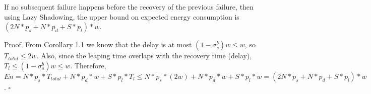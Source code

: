 \begin{theorem}
If no subsequent failure happens before the recovery of the previous failure, then using Lazy Shadowing, the upper bound on expected energy consumption is
$(2N * p_s + N * p_d + S * p_{l})*w$.
\end{theorem}
{\sc Proof}. From Corollary 1.1 we know that the delay is at most $(1-\sigma_s^b)w \le w$, so $T_{total} \le 2w$. Also, since the leaping time overlaps with the recovery time (delay), $T_l \le (1-\sigma_s^b)w \le w$. Therefore, $En = N * p_s * T_{total} + N * p_d * w + S * p_{l} * T_l \le N * p_s * (2w) + N * p_d * w + S * p_{l} * w = (2N * p_s + N * p_d + S * p_{l})*w$.
$\square$
